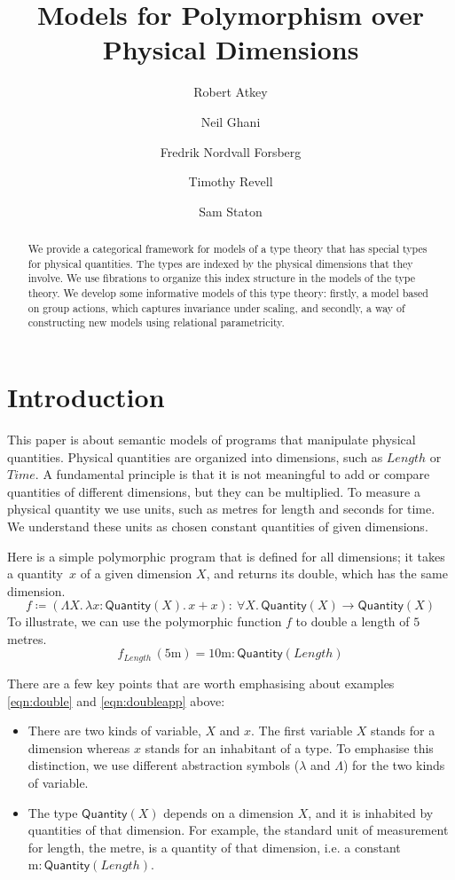 \documentclass[a4paper,UKenglish]{lipics}
\title{Models for Polymorphism over Physical Dimensions}
\author[1]{Robert Atkey}
\author[1]{Neil Ghani}
\author[1]{Fredrik Nordvall Forsberg}
\author[1]{Timothy Revell}
\author[2]{Sam Staton}
\affil[1]{University of Strathclyde}
\affil[2]{University of Oxford}
\theoremstyle{plain}
\newcommand{\msf}[1]{\mathsf{#1}} %
\newcommand{\qnt}{\msf{Quantity}}
\newcommand{\lengthDim}{\mathit{Length}}
\newcommand{\timeDim}{\mathit{Time}}
\newcommand{\Dvar}{X}
\begin{document}
\maketitle

\begin{abstract}
We provide a categorical framework for models of a type theory that has special types for physical quantities. The types are indexed by the physical dimensions that they involve. We use fibrations to organize this index structure in the models of the type theory. We develop some informative models of this type theory: firstly, a model based on group actions, which captures invariance under scaling, and secondly, a way of constructing new models using relational parametricity.
\end{abstract}

\section{Introduction}
This paper is about semantic models of programs that manipulate physical quantities. Physical quantities are organized into dimensions, such as $\lengthDim$ or $\timeDim$. A fundamental principle is that it is not meaningful to add or compare quantities of different dimensions, but they can be multiplied. 
%
To measure a physical quantity we use units, such as metres for length and seconds for time. We understand these units as chosen constant quantities of given dimensions.

Here is a simple polymorphic program that is defined for all dimensions; it takes a quantity~$x$ of a given dimension $X$, and returns its double, which has the same dimension.
\begin{equation}
f\coloneqq (\Lambda X.\,\lambda x:\qnt(X).\,x+x)
:\ \forall X.\,\qnt(X)\to \qnt(X)
\label{eqn:double}
\end{equation}
To illustrate, we can use the polymorphic function $f$ to double a length of $5$ metres.
\begin{equation}
f_\lengthDim\,(5\mathrm{m})=
10\mathrm{m}:\qnt(\lengthDim)
\label{eqn:doubleapp}
\end{equation}

\noindent There are a few key points that are worth emphasising about examples \eqref{eqn:double} and \eqref{eqn:doubleapp} above:
\begin{itemize}
\item There are two kinds of variable, $\Dvar$ and $x$. The first variable $\Dvar$ stands for a dimension whereas $x$ stands for an inhabitant of a type. To emphasise this distinction, we use different abstraction symbols ($\lambda$ and $\Lambda$) for the two kinds of variable.
\item The type $\qnt(\Dvar)$ depends on a dimension $\Dvar$, and it is inhabited by quantities of that dimension. For example, the standard unit of measurement for length, the metre, is a quantity of that dimension, i.e. a constant $\mathrm m:\qnt(\lengthDim)$.
\end{itemize}
\end{document}
